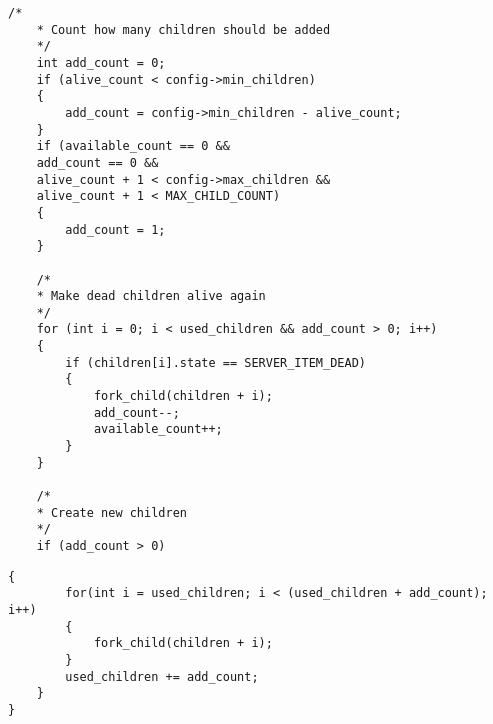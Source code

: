 \begin{lstlisting}[title={Продолжение листинга \ref{check-children}}, label=check-children1, firstnumber=22]
	/*
	* Count how many children should be added
	*/
	int add_count = 0;
	if (alive_count < config->min_children)
	{
		add_count = config->min_children - alive_count;
	}
	if (available_count == 0 && 
	add_count == 0 && 
	alive_count + 1 < config->max_children && 
	alive_count + 1 < MAX_CHILD_COUNT)
	{
		add_count = 1;
	}
	
	/*
	* Make dead children alive again
	*/
	for (int i = 0; i < used_children && add_count > 0; i++)
	{
		if (children[i].state == SERVER_ITEM_DEAD)
		{
			fork_child(children + i);
			add_count--;
			available_count++;
		}
	}
	
	/*
	* Create new children
	*/
	if (add_count > 0)
\end{lstlisting}

\begin{lstlisting}[title={Окончание листинга \ref{check-children}}, label=check-children2, firstnumber=55]
	{
		for(int i = used_children; i < (used_children + add_count); i++)
		{
			fork_child(children + i);
		}
		used_children += add_count;
	}
}
\end{lstlisting}

\pagebreak